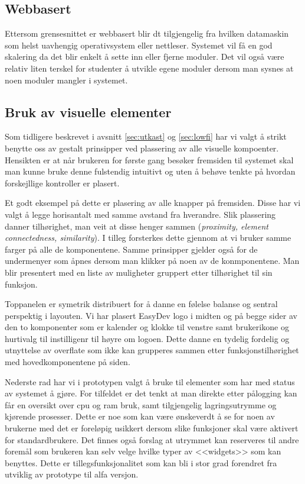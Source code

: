 \subsection{Webbasert}
Ettersom grensesnittet er webbasert blir dt tilgjengelig fra hvilken datamaskin som helst uavhengig operativsystem eller nettleser. Systemet vil få en god skalering da  det blir enkelt å sette inn eller fjerne moduler. Det vil også være relativ liten terskel for studenter å utvikle egene moduler dersom man sysnes at noen moduler mangler i systemet. 

\subsection{Bruk av visuelle elementer}
Som tidligere beskrevet i avsnitt \ref{sec:utkast} og \ref{sec:lowfi} har vi valgt å strikt benytte oss av gestalt prinsipper ved plassering av alle visuelle kompoenter. Hensikten er at når brukeren for første gang besøker fremsiden til systemet skal man kunne bruke denne fulstendig intuitivt og uten å behøve tenkte på hvordan forskejllige kontroller er plasert. 

Et godt eksempel på dette er plasering av alle knapper på fremsiden. Disse har vi valgt å legge horisantalt med samme avstand fra hverandre. Slik plassering danner tilhørighet, man veit at disse henger sammen (\textit{proximity, element connectedness, similarity}). I tilleg forsterkes dette gjennom at vi bruker samme farger på alle de komponentene.\cite{forelesning:tulpesh}
Samme prinsipper gjelder også for de undermenyer som åpnes dersom man klikker på noen av de konmponentene. Man blir presentert med en liste av muligheter gruppert etter tilhørighet til sin funksjon. 

Toppanelen er symetrik distribuert for å danne en følelse balanse og sentral perspektig i layouten. Vi har plasert EasyDev logo i midten og på begge sider av den to komponenter som er kalender og klokke til venstre samt brukerikone og hurtivalg til instilligenr til høyre om logoen. Dette danne en tydelig fordelig og utnyttelse av overflate som ikke kan grupperes sammen etter funksjonstilhørighet med hovedkomponentene på siden.

Nederste rad har vi i prototypen valgt å bruke til elementer som har med status av systemet å gjøre. For tilfeldet er det tenkt at man direkte etter pålogging kan får en oversikt over cpu og ram bruk, samt tilgjengelig lagringsutrymme og kjørende prosesser. Dette er noe som kan være ønskeverdt å se for noen av brukerne med det er foreløpig usikkert dersom slike funksjoner skal være aktivert for standardbrukere. Det finnes også forslag at utrymmet kan reserveres til andre foremål som brukeren kan selv velge hvilke typer av <<widgets>> som kan benyttes. Dette er tillegsfunksjonalitet som kan bli i stor grad forendret fra utviklig av prototype til alfa versjon.

